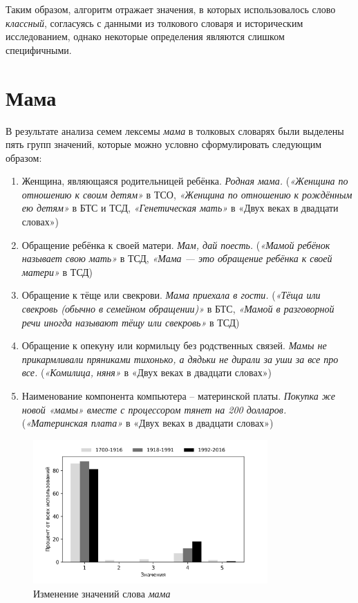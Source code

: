 Таким образом, алгоритм отражает значения, в которых использовалось
слово \textit{классный}, согласуясь с данными из толкового словаря и историческим исследованием,
однако некоторые определения являются слишком специфичными.

\section*{Мама}

В результате анализа семем лексемы \textit{мама} в толковых словарях были выделены
пять групп значений, которые можно условно сформулировать следующим образом:

\begin{enumerate}
    \item Женщина, являющаяся родительницей ребёнка. \textit{Родная мама.}
(\textit{«Женщина по отношению к своим детям»} в ТСО,
\textit{«Женщина по отношению к рождённым ею детям»} в БТС и ТСД,
\textit{«Генетическая мать»} в «Двух веках в двадцати словах»)

    \item Обращение ребёнка к своей матери. \textit{Мам, дай поесть.}
(\textit{«Мамой ребёнок называет свою мать»} в ТСД,
\textit{«Мама — это обращение ребёнка к своей матери»} в ТСД)

    \item Обращение к тёще или свекрови. \textit{Мама приехала в гости.}
(\textit{«Тёща или свекровь (обычно в семейном обращении)»} в БТС,
\textit{«Мамой в разговорной речи иногда называют тёщу или свекровь»} в ТСД)

    \item Обращение к опекуну или кормильцу без родственных связей. \textit{Мамы не прикармливали пряниками тихонько, а дядьки не дирали за уши за все про все.}
(\textit{«Комилица, няня»} в «Двух веках в двадцати словах»)

    \item Наименование компонента компьютера – материнской платы. \textit{Покупка же новой «мамы» вместе с процессором тянет на 200 долларов.}
(\textit{«Материнская плата»} в «Двух веках в двадцати словах»)
\end{enumerate}

\begin{figure}[H]
	\centering
	\includegraphics[width=0.8\textwidth]{img/visualizations/mama_minimal}
	\caption{Изменение значений слова \textit{мама}}
	\label{fig:Мама}
\end{figure}

